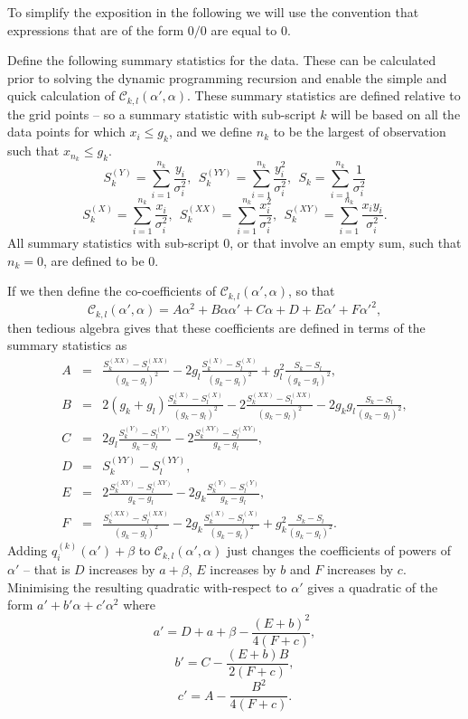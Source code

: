 \documentclass[article]{jss}
\begin{document}
To simplify the exposition in the following we will use the convention that expressions that are of the form $0/0$ are equal to 0.

Define the following summary statistics for the data. These can be calculated prior to solving the dynamic programming recursion and enable the simple and quick calculation of $\mathcal{C}_{k,l}(\alpha',\alpha)$. These summary statistics are defined relative to the grid points -- so a summary statistic with sub-script $k$ will be based on all the data points for which $x_i\leq g_k$, and we define $n_k$ to be the largest of observation such that $x_{n_k}\leq g_k$.  
\[
S^{(Y)}_k=\sum_{i=1}^{n_k} \frac{y_i}{\sigma_i^2},~~S^{(YY)}_k=\sum_{i=1}^{n_k} \frac{y^2_i}{\sigma_i^2},~~S^{}_k=\sum_{i=1}^{n_k} \frac{1}{\sigma_i^2}
\]
\[
S^{(X)}_k=\sum_{i=1}^{n_k} \frac{x_i}{\sigma_i^2},~~S^{(XX)}_k=\sum_{i=1}^{n_k} \frac{x^2_i}{\sigma_i^2},~~S^{(XY)}_k=\sum_{i=1}^{n_k} \frac{x_iy_i}{\sigma_i^2}.
\]
All summary statistics with sub-script 0, or that involve an empty sum, such that $n_k=0$, are defined to be 0.

If we then define the co-coefficients of $\mathcal{C}_{k,l}(\alpha',\alpha)$, so that
\[
\mathcal{C}_{k,l}(\alpha',\alpha)=A\alpha^2+B\alpha\alpha'+C\alpha+D+E\alpha'+F\alpha'^2,
\]
then tedious algebra gives that these coefficients are defined in terms of the summary statistics as
\begin{eqnarray*}
A&=&\frac{S^{(XX)}_k-S^{(XX)}_l}{(g_k-g_l)^2}-2g_l\frac{S^{(X)}_k-S^{(X)}_l}{(g_k-g_l)^2}+g_l^2\frac{S_k-S_l}{(g_k-g_l)^2},\\
B&=&2(g_k+g_l)\frac{S^{(X)}_k-S^{(X)}_l}{(g_k-g_l)^2}-2\frac{S^{(XX)}_k-S^{(XX)}_l}{(g_k-g_l)^2}-2g_kg_l\frac{S_k-S_l}{(g_k-g_l)^2},\\
C&=&2g_l\frac{S^{(Y)}_k-S^{(Y)}_l}{g_k-g_l}-2\frac{S^{(XY)}_k-S^{(XY)}_l}{g_k-g_l} ,\\ 
D&=&S^{(YY)}_k-S^{(YY)}_l, \\
E&=& 2\frac{S^{(XY)}_k-S^{(XY)}_l}{g_k-g_l}-2g_k\frac{S^{(Y)}_k-S^{(Y)}_l}{g_k-g_l},\\
F&=&\frac{S^{(XX)}_k-S^{(XX)}_l}{(g_k-g_l)^2}-2g_k\frac{S^{(X)}_k-S^{(X)}_l}{(g_k-g_l)^2}+g_k^2\frac{S_k-S_l}{(g_k-g_l)^2}. 
\end{eqnarray*}
Adding $q_{i}^{(k)}(\alpha')+\beta$ to $\mathcal{C}_{k,l}(\alpha',\alpha)$ just changes the coefficients of powers of $\alpha'$ -- that is $D$ increases by $a+\beta$, $E$ increases by $b$ and $F$ increases by $c$. Minimising the resulting quadratic with-respect to $\alpha'$ gives a quadratic of the form $a'+b'\alpha+c'\alpha^2$ where
\[
a'=D+a+\beta-\frac{(E+b)^2}{4(F+c)},
\]
\[
b'=C-\frac{(E+b)B}{2(F+c)},
\]
\[
c'=A-\frac{B^2}{4(F+c)}.
\]
\end{document}
